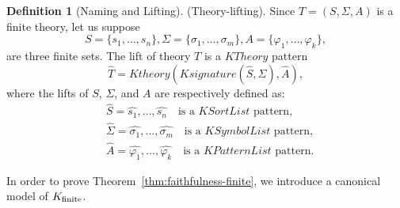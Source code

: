 \documentclass[UTF8,11pt]{article}
\newcounter{thmcounter}
\theoremstyle{plain}
\theoremstyle{definition}
\newtheorem{definition} [thmcounter]{Definition}
\theoremstyle{remark}
\newcommand{\KPatternList}{\mathit{KPatternList}}
\newcommand{\KSortList}{\mathit{KSortList}}
\newcommand{\KSymbolList}{\mathit{KSymbolList}}
\newcommand{\Ksignature}{\mathit{Ksignature}}
\newcommand{\KTheory}{\mathit{KTheory}}
\newcommand{\Ktheory}{\mathit{Ktheory}}
\begin{document}
\begin{definition}[Naming and Lifting]
    (Theory-lifting). Since $T = (S, \Sigma, A)$ is a finite theory, let us suppose
    \begin{equation*}
       S = \{ s_1, \dots, s_n \}, 
       \Sigma = \{ \sigma_1, \dots, \sigma_m \}, 
       A = \{ \varphi_1, \dots, \varphi_k \},
    \end{equation*}
    are three finite sets. The lift of theory $T$ is a $\KTheory$ pattern 
    $$ \hat{T} = \Ktheory(\Ksignature(\hat{S}, \hat{\Sigma}), \hat{A}),$$
    where the lifts of $S$, $\Sigma$, and $A$ are respectively defined as:
    \begin{align*}
    & \hat{S} = \hat{s_1},\dots,\hat{s_n} 
      \quad \text{is a $\KSortList$ pattern},
    \\
    & \hat{\Sigma} = \hat{\sigma_1},\dots,\hat{\sigma_m}
      \quad \text{is a $\KSymbolList$ pattern},
    \\
    & \hat{A} = \hat{\varphi_1}, \dots, \hat{\varphi_k}
      \quad \text{is a $\KPatternList$ pattern}.
    \end{align*}
\end{definition}

In order to prove Theorem~\ref{thm:faithfulness-finite}, we introduce a canonical model of ${K_\text{finite}}$.
\end{document}
